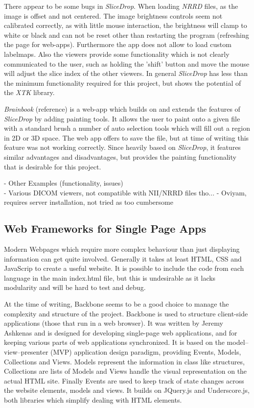 \documentclass[a4paper,11pt,titlepage]{article}
\begin{document}
There appear to be some bugs in \textit{SliceDrop}. When loading \textit{NRRD} files, as the image is offset and not centered. The image brightness controls seem not calibrated correctly, as with little mouse interaction, the brightness will clamp to white or black and can not be reset other than restarting the program (refreshing the page for web-apps). Furthermore the app does not allow to load custom labelmaps. Also the viewers provide some functionality which is not clearly communicated to the user, such as holding the 'shift' button and move the mouse will adjust the slice index of the other viewers. In general \textit{SliceDrop} has less than the minimum functionality required for this project, but shows the potential of the \textit{XTK} library. 

\textit{Brainbook} (reference) is a web-app which builds on and extends the features of \textit{SliceDrop} by adding painting tools. It allows the user to paint onto a given file with a standard brush a number of auto selection tools which will fill out a region in 2D or 3D space. The web app offers to save the file, but at time of writing this feature was not working correctly. Since heavily based on \textit{SliceDrop}, it features similar advantages and disadvantages, but provides the painting functionality that is desirable for this project.

- Other Examples (functionality, issues)\\
- Various DICOM viewers, not compatible with NII/NRRD files tho...
- Oviyam, requires server installation, not tried as too cumbersome

\subsection{Web Frameworks for Single Page Apps}


Modern Webpages which require more complex behaviour than just displaying information can get quite involved. Generally it takes at least HTML, CSS and JavaScrip to create a useful website. It is possible to include the code from each language in the main index.html file, but this is undesirable as it lacks modularity and will be hard to test and debug.

At the time of writing, Backbone seems to be a good choice to manage the complexity and structure of the project. Backbone is used to structure client-side applications (those that run in a web browser). It was written by Jeremy Ashkenas and is designed for developing single-page web applications, and for keeping various parts of web applications synchronized. It is based on the model–view–presenter (MVP) application design paradigm, providing Events, Models, Collections and Views. Models represent the information in class like structures, Collections are lists of Models and Views handle the visual representation on the actual HTML site. Finally Events are used to keep track of state changes across the website elements, models and views. It builds on JQuery.js and Underscore.js, both libraries which simplify dealing with HTML elements.
\end{document}
